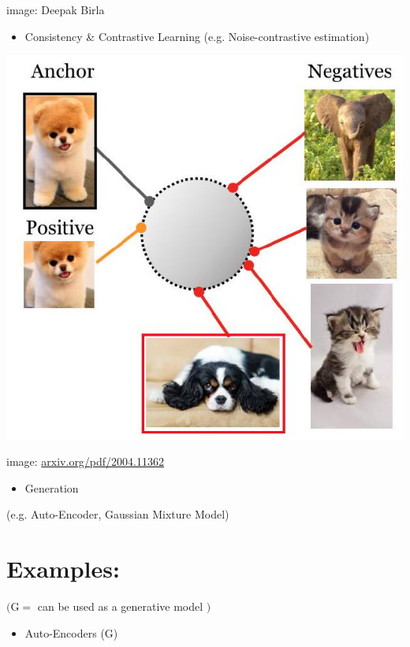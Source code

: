 \documentclass[10pt]{article}
\begin{document}
image: Deepak Birla

\begin{itemize}
  \item Consistency \& Contrastive Learning (e.g. Noise-contrastive estimation)
\end{itemize}

\begin{center}
\includegraphics[max width=\textwidth]{2024_01_08_e090cb7d953bac87fc33g-08(1)}
\end{center}

image: \href{http://arxiv.org/pdf/2004.11362}{arxiv.org/pdf/2004.11362}

\begin{itemize}
  \item Generation
\end{itemize}

(e.g. Auto-Encoder, Gaussian Mixture Model)

\section*{Examples:}
$(\mathrm{G}=$ can be used as a generative model $)$

\begin{itemize}
  \item Auto-Encoders (G)
\end{itemize}
\end{document}
